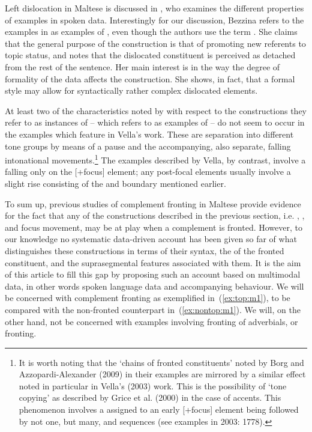 \documentclass[output=paper]{LSP/langsci}
\begin{document}
Left dislocation in Maltese is discussed in \citet{Bezzina2015}, who
examines the different properties of  examples in spoken
data. Interestingly for our discussion, Bezzina refers to the examples
in \citet{BorgAlexander2009} as examples of , even
though the authors use the term . She claims that the
general purpose of the construction is that of promoting new referents
to topic status, and notes that the dislocated constituent is
perceived as detached from the rest of the sentence. Her main interest
is in the way the degree of formality of the data affects the
construction. She shows, in fact, that a formal style may allow for
syntactically rather complex dislocated elements. 

At least two of the characteristics noted by \citet{BorgAlexander2009}
with respect to the constructions they refer to as instances of
 – which \citet{Bezzina2015} refers to as examples of
 – do not seem to occur in the  examples
which feature in Vella’s work. These are separation into different
tone groups by means of a pause and the accompanying, also separate,
falling intonational movements.\footnote{It is worth noting that the
  `chains of fronted constituents' noted by Borg and
  Azzopardi-Alexander (2009) in their examples are mirrored by a
  similar effect noted in particular in Vella’s (2003) work. This is
  the possibility of `tone copying' as described by Grice et
  al. (2000) in the case of  accents. This phenomenon involves a
   assigned to an early [+focus] element being followed by
  not one, but many,  and  sequences (see
  examples in 2003: 1778).} The  examples described by
Vella, by contrast, involve a falling  only on the [+focus] 
element; any post-focal elements usually involve a slight
rise consisting of the  and boundary  mentioned
earlier.

To sum up, previous studies of complement fronting in Maltese provide
evidence for the fact that any of the constructions described in
the previous section, i.e. , , and focus
movement, may be at play when a complement is fronted. However, to our
knowledge no systematic data-driven account has been given so far of
what distinguishes these constructions in terms of their syntax,
the  of the fronted constituent, and the
suprasegmental features associated with them. It is the aim of this
article to fill this gap by proposing such an account based on
multimodal data, in other words spoken language data and accompanying
 behaviour. We will be concerned with complement fronting as
exemplified in~(\ref{ex:top:m1}), to be compared with the non-fronted
counterpart in~(\ref{ex:nontop:m1}). We will, on the other hand, not
be concerned with examples involving fronting of adverbials, or
 fronting.
\end{document}
